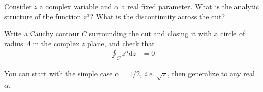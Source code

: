 
Consider $z$ a complex variable and $\alpha$ a real fixed parameter. What is the analytic structure of the function $z^\alpha$? What is the discontinuity across the cut?

Write a Cauchy contour $C$ surrounding the cut and closing it with a circle of radius $\Lambda$ in the complex $z$ plane, and check that 
\begin{align}
    \oint_{C} z^\alpha \mathrm d z & = 0
\end{align}

You can start with the simple case $\alpha = 1/2$, {\it i.e.} $\sqrt{z}$, then generalize to any real $\alpha$. 